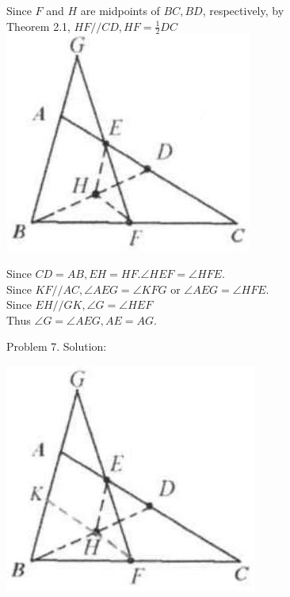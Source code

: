 \documentclass[10pt]{article}
\begin{document}
Since \(F\) and \(H\) are midpoints of \(B C, B D\), respectively, by\\
Theorem 2.1, \(H F / / C D, H F=\frac{1}{2} D C\)\\
\includegraphics[max width=\textwidth, center]{2025_04_17_97bc1f7e44d93c271a88g-050(1)}

Since \(C D=A B, E H=H F . \angle H E F=\angle H F E\).\\
Since \(K F / / A C, \angle A E G=\angle K F G\) or \(\angle A E G=\angle H F E\).\\
Since \(E H / / G K, \angle G=\angle H E F\)\\
Thus \(\angle G=\angle A E G, A E=A G\).

Problem 7. Solution:
\begin{center}
\includegraphics[max width=\textwidth]{2025_04_17_97bc1f7e44d93c271a88g-050}
\end{center}
\end{document}
